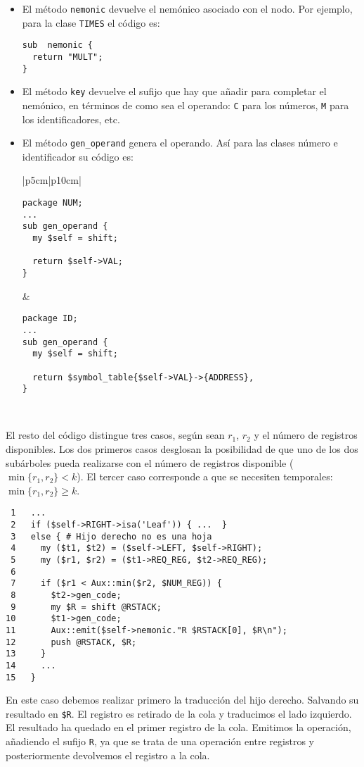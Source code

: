 \begin{itemize}
\item
El método \verb|nemonic| devuelve el nemónico asociado con el nodo.
Por ejemplo, para la clase \verb|TIMES| el código es:
\begin{verbatim}
sub  nemonic {
  return "MULT";
}
\end{verbatim}
\item
El método \verb|key| devuelve el sufijo que hay que añadir 
para completar el nemónico, en términos de como sea el
operando: \verb|C| para los números, \verb|M| para los 
identificadores, etc.
\item
El método \verb|gen_operand| genera el operando. Así para las clases
número e identificador su código es:

\vspace{0,1cm}
\begin{tabular}{|p{5cm}|p{10cm}|}
\hline 
\begin{verbatim}
package NUM;
...
sub gen_operand {
  my $self = shift;

  return $self->VAL;
}
\end{verbatim} &
\begin{verbatim}
package ID;
...
sub gen_operand {
  my $self = shift;

  return $symbol_table{$self->VAL}->{ADDRESS},
}
\end{verbatim}\\
\hline
\end{tabular}
\vspace{0,1cm}


\end{itemize}

El resto del código distingue  tres casos,
según sean $r_1$, $r_2$ y el número de registros
disponibles. 
Los dos primeros casos desglosan
la posibilidad de que uno de los dos subárboles
pueda realizarse con el número de registros
disponible ($\min \{r_1, r_2 \} < k$).
El tercer caso corresponde a que 
se necesiten temporales: $\min \{r_1, r_2 \} \ge k$.


\begin{verbatim}
 1   ...
 2   if ($self->RIGHT->isa('Leaf')) { ...  }
 3   else { # Hijo derecho no es una hoja
 4     my ($t1, $t2) = ($self->LEFT, $self->RIGHT);
 5     my ($r1, $r2) = ($t1->REQ_REG, $t2->REQ_REG);
 6 
 7     if ($r1 < Aux::min($r2, $NUM_REG)) {
 8       $t2->gen_code;
 9       my $R = shift @RSTACK;
10       $t1->gen_code;
11       Aux::emit($self->nemonic."R $RSTACK[0], $R\n");
12       push @RSTACK, $R;
13     }
14     ...
15   }
\end{verbatim}
En este caso debemos realizar primero la traducción
del hijo derecho. Salvando su resultado en \verb|$R|. 
El registro es retirado de la cola y traducimos el 
lado izquierdo. El resultado ha quedado en el primer
registro de la cola. Emitimos la operación, añadiendo
el sufijo \verb|R|, ya que se trata de una operación entre registros
y posteriormente devolvemos el registro a la cola.

